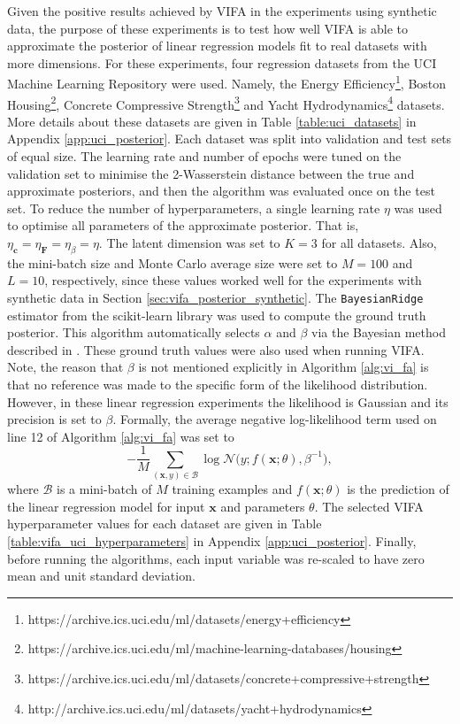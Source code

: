 \documentclass[msc,deptreport.inf]{infthesis} %
\newcommand{\matr}[1]{\mathbf{#1}}
\begin{document}
Given the positive results achieved by VIFA in the experiments using synthetic data, the purpose of these experiments is to test how well VIFA is able to approximate the posterior of linear regression models fit to real datasets with more dimensions. For these experiments, four regression datasets from the UCI Machine Learning Repository \cite{dua2019} were used. Namely, the Energy Efficiency\footnote{https://archive.ics.uci.edu/ml/datasets/energy+efficiency}, Boston Housing\footnote{https://archive.ics.uci.edu/ml/machine-learning-databases/housing}, Concrete Compressive Strength\footnote{https://archive.ics.uci.edu/ml/datasets/concrete+compressive+strength} and Yacht Hydrodynamics\footnote{http://archive.ics.uci.edu/ml/datasets/yacht+hydrodynamics} datasets. More details about these datasets are given in Table \ref{table:uci_datasets} in Appendix \ref{app:uci_posterior}. Each dataset was split into validation and test sets of equal size. The learning rate and number of epochs were tuned on the validation set to minimise the 2-Wasserstein distance between the true and approximate posteriors, and then the algorithm was evaluated once on the test set. To reduce the number of hyperparameters, a single learning rate $\eta$ was used to optimise all parameters of the approximate posterior. That is, $\eta_\matr{c} = \eta_\matr{F} = \eta_\beta = \eta$. The latent dimension was set to $K=3$ for all datasets. Also, the mini-batch size and Monte Carlo average size were set to $M=100$ and $L=10$, respectively, since these values worked well for the experiments with synthetic data in Section \ref{sec:vifa_posterior_synthetic}. The \texttt{BayesianRidge} estimator from the scikit-learn library \cite{pedregosa2012} was used to compute the ground truth posterior. This algorithm automatically selects $\alpha$ and $\beta$ via the Bayesian method described in \cite{mackay1992}. These ground truth values were also used when running VIFA. Note, the reason that $\beta$ is not mentioned explicitly in Algorithm \ref{alg:vi_fa} is that no reference was made to the specific form of the likelihood distribution. However, in these linear regression experiments the likelihood is Gaussian and its precision is set to $\beta$. Formally, the average negative log-likelihood term used on line 12 of Algorithm \ref{alg:vi_fa} was set to
\begin{equation}
	-\frac{1}{M} \sum_{(\matr{x}, y) \in \mathcal{B}} \log \mathcal{N}\big(y; f(\matr{x}; \theta), \beta^{-1}\big),
\end{equation}
where $\mathcal{B}$ is a mini-batch of $M$ training examples and $f(\matr{x}; \theta)$ is the prediction of the linear regression model for input $\matr{x}$ and parameters $\theta$. The selected VIFA hyperparameter values for each dataset are given in Table \ref{table:vifa_uci_hyperparameters} in Appendix \ref{app:uci_posterior}. Finally, before running the algorithms, each input variable was re-scaled to have zero mean and unit standard deviation.
\end{document}
